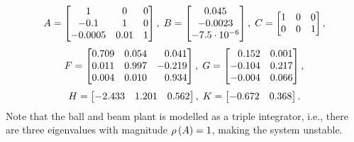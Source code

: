 \begin{equation*}
    A = \begin{bmatrix}
        1 & 0 & 0 \\
        -0.1 & 1 & 0 \\
        -0.0005 & 0.01 & 1
    \end{bmatrix}, \; B = \begin{bmatrix}
        0.045 \\
        -0.0023 \\
        -7.5\cdot 10^{-6}
    \end{bmatrix}, \;
    C = \begin{bmatrix}
        1 & 0 & 0 \\
        0 & 0 & 1
    \end{bmatrix},
\end{equation*}
\begin{equation*}
    F = \begin{bmatrix}
        0.709  & 0.054 &  \phantom{+}0.041 \\
        0.011  & 0.997 & -0.219 \\
        0.004  & 0.010 &  \phantom{+}0.934
    \end{bmatrix}, \; G = \begin{bmatrix}
        \phantom{+}0.152  & 0.001 \\
        -0.104 & 0.217 \\
        -0.004 & 0.066 \\
    \end{bmatrix},
\end{equation*}
\begin{equation*}
    H = \begin{bmatrix}
        -2.433 & 1.201 & 0.562
    \end{bmatrix}, \; K = \begin{bmatrix}
        -0.672 & 0.368
    \end{bmatrix}.
\end{equation*}
%
Note that the ball and beam plant is modelled as a triple integrator, i.e., there are three eigenvalues with magnitude $\rho\left( A \right) = 1$, making the system unstable.

